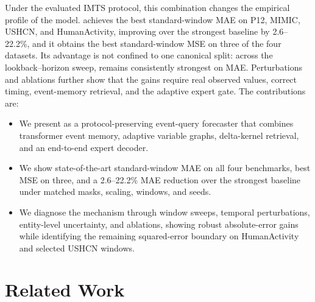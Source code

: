 \documentclass[preprint,12pt]{elsarticle}
\begin{document}
Under the evaluated IMTS protocol, this combination changes the empirical
profile of the model. \method{} achieves the best standard-window MAE on P12,
MIMIC, USHCN, and HumanActivity, improving over the strongest baseline by
2.6--22.2\%, and it obtains the best standard-window MSE on three of the four
datasets. Its advantage is not confined to one canonical split: across the
lookback--horizon sweep, \method{} remains consistently strongest on MAE.
Perturbations and ablations further show that the gains require real observed
values, correct timing, event-memory retrieval, and the adaptive expert gate.
The contributions are:
\begin{itemize}
    \item We present \method{} as a protocol-preserving event-query forecaster
    that combines transformer event memory, adaptive variable graphs,
    delta-kernel retrieval, and an end-to-end expert decoder.
    \item We show state-of-the-art standard-window MAE on all four benchmarks,
    best MSE on three, and a 2.6--22.2\% MAE reduction over the strongest
    baseline under matched masks, scaling, windows, and seeds.
    \item We diagnose the mechanism through window sweeps, temporal
    perturbations, entity-level uncertainty, and ablations, showing robust
    absolute-error gains while identifying the remaining squared-error boundary
    on HumanActivity and selected USHCN windows.
\end{itemize}

\section{Related Work}
\label{sec:related-work}
\end{document}
